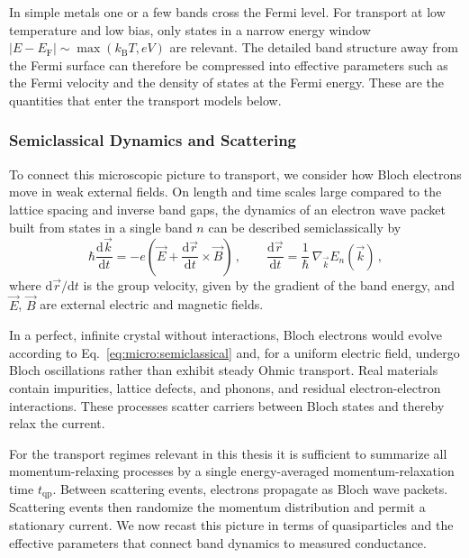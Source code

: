             In simple metals one or a few bands cross the Fermi level. For transport at low temperature and low bias, only states in a narrow energy window $\lvert E - E_\mathrm{F} \rvert \sim \max(k_\mathrm{B}T, eV)$ are relevant. The detailed band structure away from the Fermi surface can therefore be compressed into effective parameters such as the Fermi velocity and the density of states at the Fermi energy. These are the quantities that enter the transport models below. \cite{ashcroft_solid_2012,bloch_uber_1929}

        \subsubsection*{Semiclassical Dynamics and Scattering}

            To connect this microscopic picture to transport, we consider how Bloch electrons move in weak external fields. On length and time scales large compared to the lattice spacing and inverse band gaps, the dynamics of an electron wave packet built from states in a single band $n$ can be described semiclassically by
            \begin{equation}
                \hbar \frac{\mathrm{d}\vec{k}}{\mathrm{d}t} = -e\left(
                    \vec{E} + \frac{\mathrm{d}\vec{r}}{\mathrm{d}t} \times \vec{B}
                \right)\,,
                \qquad
                \frac{\mathrm{d}\vec{r}}{\mathrm{d}t} = \frac{1}{\hbar}\,\nabla_{\vec{k}} E_n(\vec{k})\,,
                \label{eq:micro:semiclassical}
            \end{equation}
            where $\mathrm{d}\vec{r}/\mathrm{d}t$ is the group velocity, given by the gradient of the band energy, and $\vec{E}$, $\vec{B}$ are external electric and magnetic fields. \cite{ashcroft_solid_2012}

            In a perfect, infinite crystal without interactions, Bloch electrons would evolve according to Eq.~\eqref{eq:micro:semiclassical} and, for a uniform electric field, undergo Bloch oscillations rather than exhibit steady Ohmic transport. Real materials contain impurities, lattice defects, and phonons, and residual electron-electron interactions. These processes scatter carriers between Bloch states and thereby relax the current. \cite{bloch_uber_1929,zener_theory_1934}

            For the transport regimes relevant in this thesis it is sufficient to summarize all momentum-relaxing processes by a single energy-averaged momentum-relaxation time $t_\mathrm{qp}$. Between scattering events, electrons propagate as Bloch wave packets. Scattering events then randomize the momentum distribution and permit a stationary current. We now recast this picture in terms of quasiparticles and the effective parameters that connect band dynamics to measured conductance. \cite{ashcroft_solid_2012, gross_festkorperphysik_2014}

